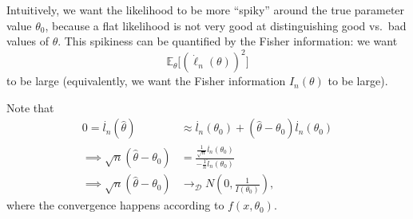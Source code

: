 \documentclass{tufte-handout}
\newcommand*\E{\mathbb{E}}
\theoremstyle{definition}
\begin{document}
Intuitively, we want the likelihood to be more ``spiky'' around the true parameter value $\theta_0$, 
because a flat likelihood is not very good at distinguishing good vs.\ bad values of $\theta$. 
This spikiness can be quantified by the Fisher information: we want
\[
  \E_\theta\bigl[(\dot{\ell}_n(\theta))^2\bigr]
\]
to be large (equivalently, we want the Fisher information $I_n(\theta)$ to be large).

Note that
\begin{align*}
	0 = \dot{l_n}(\hat{\theta}) &\approx \dot{l_n}(\theta_0) + (\hat{\theta}-\theta_0) \dot{l_n}(\theta_0) \\
	\implies \sqrt{n} \left( \hat{\theta} - \theta_0 \right) &= \frac{\frac{1}{\sqrt{n}} \dot{l_n}(\theta_0)}{-\frac{1}{n} \ddot{l}_n(\theta_0)} \\
	\implies \sqrt{n} (\hat{\theta} - \theta_0) &\to_{\mathscr{D}} N(0,\frac{1}{I(\theta_0)})
,\end{align*}
where the convergence happens according to $f(x,\theta_0)$.
\end{document}
